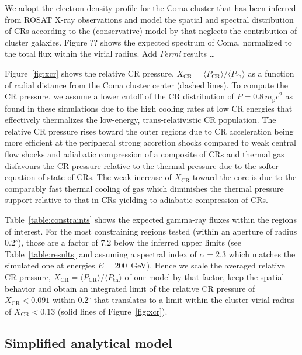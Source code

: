 \documentclass[12pt,manuscript]{aastex}
\newcommand{\rmn}{\mathrm}
\newcommand{\CR}{\mathrm{CR}}
\newcommand{\bra}{\langle}
\newcommand{\ket}{\rangle}
\begin{document}
We adopt the electron density profile for the Coma cluster that has been
inferred from ROSAT X-ray observations \citep{article:BrielHenryBohringer:1992} and model the
spatial and spectral distribution of CRs according to the (conservative) model
by \citet{article:PinzkePfrommer:2010} that neglects the contribution of cluster
galaxies. Figure ?? shows the expected spectrum of Coma, normalized to the total
flux within the virial radius. Add {\em Fermi} results \ldots

Figure~\ref{fig:xcr} shows the relative CR pressure, $X_\CR = \bra P_\CR
\ket / \bra P_\rmn{th} \ket$ as a function of radial distance from the
Coma cluster center (dashed lines). To compute the CR pressure, we assume a
lower cutoff of the CR distribution of $P = 0.8\,m_\rmn{p} c^2$ as found in
these simulations due to the high cooling rates at low CR energies that
effectively thermalizes the low-energy, trans-relativistic CR population.  The
relative CR pressure rises toward the outer regions due to CR acceleration being
more efficient at the peripheral strong accretion shocks compared to weak
central flow shocks and adiabatic compression of a composite of CRs and thermal
gas disfavours the CR pressure relative to the thermal pressure due to the
softer equation of state of CRs. The weak increase of $X_\CR$ toward the core is
due to the comparably fast thermal cooling of gas which diminishes the thermal
pressure support relative to that in CRs yielding to adiabatic compression of
CRs.

Table~\ref{table:constraints} shows the expected gamma-ray fluxes within the
regions of interest. For the most constraining regions tested (within an
aperture of radius 0.2$^\circ$), those are a factor of 7.2 below the inferred
upper limits (see Table~\ref{table:results} and assuming a spectral index of
$\alpha=2.3$ which matches the simulated one at energies $E=200$~GeV).  Hence we
scale the averaged relative CR pressure, $X_\CR = \bra P_\CR \ket /
\bra P_\rmn{th} \ket$ of our model by that factor, keep the spatial
behavior and obtain an integrated limit of the relative CR pressure of
$X_\CR<0.091$ within 0.2$^\circ$ that translates to a limit within the cluster
virial radius of $X_\CR<0.13$ (solid lines of Figure~\ref{fig:xcr}).



\subsection{Simplified analytical model}
\end{document}
